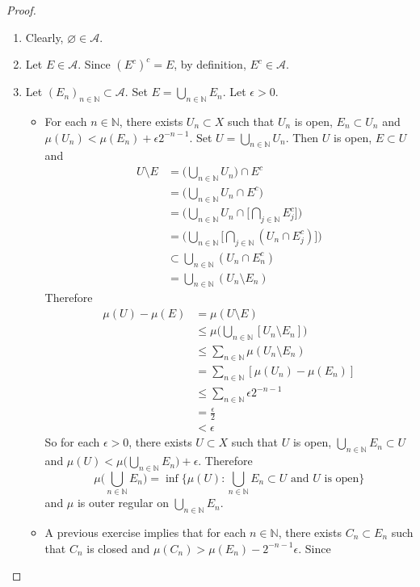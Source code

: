 \documentclass[12pt]{amsart}
\theoremstyle{definition}
\newcommand{\ep}{\epsilon}
\newcommand{\N}{\mathbb{N}}
\newcommand{\MA}{\mathcal{A}}
\begin{document}
	\begin{proof}\ 
		\begin{enumerate}
			\item Clearly, $\varnothing \in \MA$.
			\item Let $E \in \MA$. Since $(E^c)^c = E$, by definition, $E^c \in \MA$. 
			\item Let $(E_n)_{n \in \N} \subset \MA$. Set $E = \bigcup\limits_{n \in \N} E_n$. Let $\ep >0$. 
			\begin{itemize}
				\item For each $n \in \N$, there exists $U_n \subset X$ such that $U_n$ is open, $E_n \subset U_n$ and $\mu(U_n) < \mu(E_n) + \ep 2^{-n - 1 }$. Set $U = \bigcup\limits_{n\in\N} U_n$. Then $U$ is open, $E \subset U$ and 
				\begin{align*} 
					U \setminus E
					&= \bigg( \bigcup_{n \in \N} U_n \bigg) \cap  E^c \\
					&= \bigg( \bigcup_{n \in \N} U_n \cap E^c \bigg)  \\
					&= \bigg( \bigcup_{n \in \N} U_n \cap \bigg[ \bigcap_{j \in \N} E_j^c \bigg] \bigg) \\
					&= \bigg( \bigcup_{n \in \N} \bigg [ \bigcap_{j \in \N} (U_n \cap E_j^c)\bigg ]  \bigg) \\
					& \subset \bigcup_{n \in \N} (U_n \cap E_n^c)  \\
					&= \bigcup_{n \in \N} (U_n \setminus E_n) 
				\end{align*}
				Therefore
				\begin{align*}
					\mu(U) - \mu(E)
					&= \mu(U \setminus E) \\
					& \leq \mu \bigg(\bigcup_{n \in \N} [U_n \setminus E_n] \bigg) \\
					& \leq \sum_{n \in \N} \mu(U_n \setminus E_n) \\
					&= \sum_{n \in \N} [\mu(U_n) - \mu(E_n)] \\
					& \leq \sum_{n \in \N} \ep 2^{-n-1} \\
					&= \frac{\ep}{2} \\
					& < \ep
				\end{align*}
				So for each $\ep >0$, there exists $U \subset X$ such that $U$ is open, $\bigcup_{n \in \N}E_n \subset U$ and $\mu(U) < \mu \bigg( \bigcup_{n \in \N} E_n \bigg) + \ep$. Therefore $$\mu \bigg( \bigcup_{n \in \N} E_n \bigg) = \inf \bigg \{ \mu(U): \bigcup_{n \in \N} E_n \subset U \text{ and $U$ is open} \bigg \}$$
				and $\mu$ is outer regular on $\bigcup\limits_{n \in \N} E_n$.
				\item A previous exercise implies that for each $n \in \N$, there exists $C_n \subset E_n$ such that $C_n$ is closed and $\mu(C_n) > \mu(E_n) - 2^{-n-1}\ep$. Since 

\end{itemize}
\end{enumerate}
\end{proof}
\end{document}
